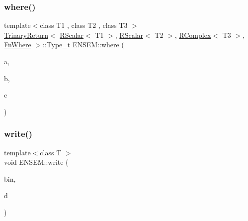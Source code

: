 \mbox{\label{group__rcomplex_ga69c3ed4f12ac9e2b1fcba29be62f0622}} 
\subsubsection{\texorpdfstring{where()}{where()}\hspace{0.1cm}{\footnotesize\ttfamily [3/3]}}
{\footnotesize\ttfamily template$<$class T1 , class T2 , class T3 $>$ \\
\mbox{\hyperlink{structENSEM_1_1TrinaryReturn}{Trinary\+Return}}$<$ \mbox{\hyperlink{classENSEM_1_1RScalar}{R\+Scalar}}$<$ T1 $>$, \mbox{\hyperlink{classENSEM_1_1RScalar}{R\+Scalar}}$<$ T2 $>$, \mbox{\hyperlink{classENSEM_1_1RComplex}{R\+Complex}}$<$ T3 $>$, \mbox{\hyperlink{structENSEM_1_1FnWhere}{Fn\+Where}} $>$\+::Type\+\_\+t E\+N\+S\+E\+M\+::where (\begin{DoxyParamCaption}\item[{const \mbox{\hyperlink{classENSEM_1_1RScalar}{R\+Scalar}}$<$ T1 $>$ \&}]{a,  }\item[{const \mbox{\hyperlink{classENSEM_1_1RScalar}{R\+Scalar}}$<$ T2 $>$ \&}]{b,  }\item[{const \mbox{\hyperlink{classENSEM_1_1RComplex}{R\+Complex}}$<$ T3 $>$ \&}]{c }\end{DoxyParamCaption})\hspace{0.3cm}{\ttfamily [inline]}}

\mbox{\label{group__rcomplex_ga5087feb4530a8e07f00227de0852c625}} 
\subsubsection{\texorpdfstring{write()}{write()}}
{\footnotesize\ttfamily template$<$class T $>$ \\
void E\+N\+S\+E\+M\+::write (\begin{DoxyParamCaption}\item[{\mbox{\hyperlink{classADATIO_1_1BinaryWriter}{A\+D\+A\+T\+I\+O\+::\+Binary\+Writer}} \&}]{bin,  }\item[{const \mbox{\hyperlink{classENSEM_1_1RComplex}{R\+Complex}}$<$ T $>$ \&}]{d }\end{DoxyParamCaption})\hspace{0.3cm}{\ttfamily [inline]}}




